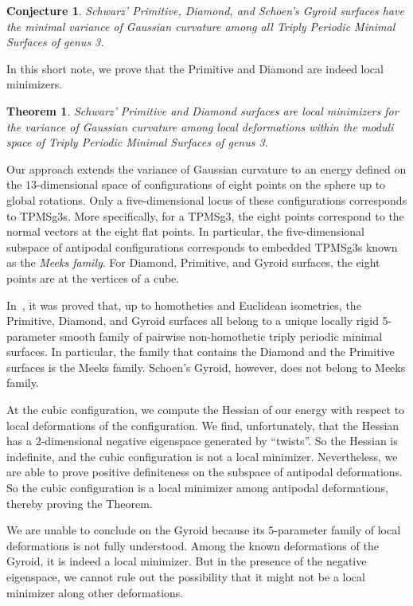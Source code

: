 \documentclass[a4paper]{amsart}
\theoremstyle{plain} %
\newtheorem*{theorem}{Theorem}
\newtheorem*{conjecture}{Conjecture}
\theoremstyle{definition} %
\theoremstyle{remark}
\begin{document}
\begin{conjecture}
	Schwarz' Primitive, Diamond, and Schoen's Gyroid surfaces have the minimal
	variance of Gaussian curvature among all Triply Periodic Minimal Surfaces of
	genus 3.
\end{conjecture}

In this short note, we prove that the Primitive and Diamond are indeed local
minimizers.

\begin{theorem} \label{thm:main}
	Schwarz' Primitive and Diamond surfaces are local minimizers for the variance
	of Gaussian curvature among local deformations within the moduli space of Triply
	Periodic Minimal Surfaces of genus 3.
\end{theorem}

Our approach extends the variance of Gaussian curvature to an energy defined on
the $13$-dimensional space of configurations of eight points on the sphere up
to global rotations.  Only a five-dimensional locus of these configurations
corresponds to TPMSg3s.  More specifically, for a TPMSg3, the eight points
correspond to the normal vectors at the eight flat points.  In particular, the
five-dimensional subspace of antipodal configurations corresponds to embedded
TPMSg3s known as the \emph{Meeks family}.  For Diamond, Primitive, and Gyroid
surfaces, the eight points are at the vertices of a cube.

In~\cite{koiso2018}, it was proved that, up to homotheties and Euclidean
isometries, the Primitive, Diamond, and Gyroid surfaces all belong to a unique
locally rigid 5-parameter smooth family of pairwise non-homothetic triply
periodic minimal surfaces.  In particular, the family that contains the Diamond
and the Primitive surfaces is the Meeks family.  Schoen's Gyroid, however, does
not belong to Meeks family.

\medskip

At the cubic configuration, we compute the Hessian of our energy with respect
to local deformations of the configuration.  We find, unfortunately, that the
Hessian has a $2$-dimensional negative eigenspace generated by ``twists''.  So
the Hessian is indefinite, and the cubic configuration is not a local
minimizer.  Nevertheless, we are able to prove positive definiteness on the
subspace of antipodal deformations.  So the cubic configuration is a local
minimizer among antipodal deformations, thereby proving the Theorem.

We are unable to conclude on the Gyroid because its $5$-parameter family of
local deformations is not fully understood.  Among the known deformations of
the Gyroid, it is indeed a local minimizer.  But in the presence of the
negative eigenspace, we cannot rule out the possibility that it might not be a
local minimizer along other deformations.
\end{document}
